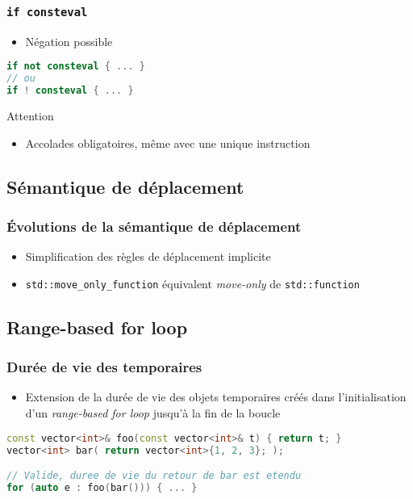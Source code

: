 \documentclass[C++.tex]{subfiles}
\begin{document}
\begin{frame}[fragile]
	\frametitle{\lstinline|if consteval|}
	\begin{itemize}
		\item Négation possible
	\end{itemize}

	\begin{lstlisting}[language=C++]
if not consteval { ... }
// ou
if ! consteval { ... }\end{lstlisting}

	\begin{alertblock}{Attention}
		\begin{itemize}
			\item Accolades obligatoires, même avec une unique instruction
		\end{itemize}
	\end{alertblock}
\end{frame}

\subsection*{Sémantique de déplacement}
\begin{frame}[fragile]
	\frametitle{Évolutions de la sémantique de déplacement}
	\begin{itemize}
		\item Simplification des règles de déplacement implicite
		\item \lstinline|std::move_only_function| équivalent \textit{move-only} de \lstinline|std::function|
	\end{itemize}
\end{frame}

\subsection*{Range-based for loop}
\begin{frame}[fragile]
	\frametitle{Durée de vie des temporaires}
	\begin{itemize}
		\item Extension de la durée de vie des objets temporaires créés dans l'initialisation d'un \textit{range-based for loop} jusqu'à la fin de la boucle
	\end{itemize}

	\begin{lstlisting}[language=C++]
const vector<int>& foo(const vector<int>& t) { return t; }
vector<int> bar( return vector<int>{1, 2, 3}; );

// Valide, duree de vie du retour de bar est etendu
for (auto e : foo(bar())) { ... }\end{lstlisting}
\end{frame}
\end{document}
